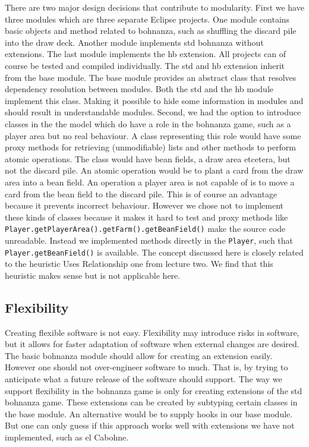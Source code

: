 There are two major design decisions that contribute to modularity. First we have three modules
which are three separate Eclipse projects. One module contains basic objects and method related to
bohnanza, such as shuffling the discard pile into the draw deck. Another module implements \gls{std} 
bohnanza without extensions. The last module implements the \gls{hb} extension. All projects can
of course be tested and compiled individually. The \gls{std} and \gls{hb} extension inherit from the
base module. The base module provides an abstract class that resolves dependency resolution between
modules. Both the \gls{std} and the \gls{hb} module implement this class. Making it possible to hide
some information in modules and should result in understandable modules.
Second, we had the option to introduce classes in the the model which do have a role in the bohnanza game, such as a player area but no
real behaviour. A class representing this role would have some proxy methods for retrieving (unmodifiable) lists and other methods to
perform atomic operations. The class would have bean fields, a draw area etcetera, but not the discard pile. An atomic operation would be
to plant a card from the draw area into a bean field. An operation a player area is not capable of is to move a card from the bean field to
the discard pile. This is of course an advantage because it prevents incorrect behaviour. However we chose not to implement these kinds of
classes because it makes it hard to test and proxy methods like \texttt{Player.getPlayerArea().getFarm().getBeanField()} make the source
code unreadable. Instead we implemented methods directly in the \texttt{Player}, such that \texttt{Player.getBeanField()} is available. The
concept discussed here is closely related to the heuristic Uses Relationship one from lecture two. We find that this heuristic makes sense
but is not applicable here.

\subsection{Flexibility}
Creating flexible software is not easy. Flexibility may introduce risks in software, but it allows for faster adaptation of software when
external changes are desired. The basic bohnanza module should allow for creating an extension easily. However one should not over-engineer
software to much. That is, by trying to anticipate what a future release of the software should support. The way we support flexibility in
the bohnanza game is only for creating extensions of the \gls{std} bohnanza game. These extensions can be created by subtyping certain
classes in the base module. An alternative would be to supply hooks in our base module. But one can only
guess if this approach works well with extensions we have not implemented, such as el Cabohne. 

